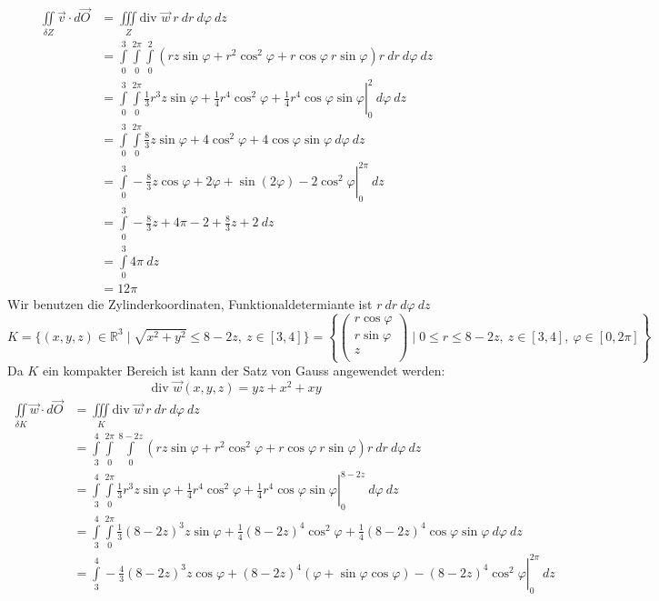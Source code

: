 \documentclass[10pt,a4paper,parskip=half]{scrartcl}
\newcommand{\R}{\mathbb{R}}
\newcommand{\vecthree}[3]{\begin{pmatrix}#1\\#2\\#3\\\end {pmatrix}}
\begin{document}
\begin{enumerate}[(a)]
      \begin{align*}
            \iint\limits_{\delta Z} \vec v \cdot d \vec O &= \iiint\limits_{Z} \text{div } \vec w~ r~dr ~d\varphi~ dz \\
            &= \int\limits_{0}^3\int\limits_0^{2\pi}\int\limits_0^2  (rz\sin\varphi + r^2\cos^2\varphi + r\cos\varphi ~r\sin\varphi )r~dr ~d\varphi~ dz \\
            &= \left.\int\limits_{0}^3\int\limits_0^{2\pi}  \frac 13 r^3z \sin \varphi + \frac 14 r^4 \cos^2 \varphi + \frac 14 r^4 \cos \varphi \sin \varphi \right|^2_0  ~d\varphi ~ dz  \\
            &= \int\limits_{0}^3\int\limits_0^{2\pi} \frac 83 z \sin \varphi + 4\cos^2 \varphi + 4\cos \varphi \sin \varphi ~d\varphi ~dz \\
            &= \left.\int\limits_0^3 -\frac 83  z \cos \varphi + 2\varphi + \sin (2\varphi ) - 2\cos^2\varphi \right|^{2\pi}_0 ~dz\\
            &= \int\limits_0^3 - \frac 83 z + 4\pi - 2 + \frac 83z + 2 ~dz \\
            &= \int\limits_0^3  4\pi ~dz \\
            &= 12\pi
      \end{align*}
Wir benutzen die Zylinderkoordinaten, Funktionaldetermiante ist $r~dr ~ d\varphi ~dz$
   \[ K = \{ (x,y,z) \in \R^3  \mid \sqrt{x^2 + y^2} \le 8 - 2z ,~z \in [3,4]\} = \left\{ \vecthree{r \cos \varphi}{r\sin \varphi}{z} \mid 0 \le r \le 8-2z, ~z \in [3,4] ,~ \varphi \in [0,2\pi] \right\} \] 
   Da $K$ ein kompakter Bereich ist kann der Satz von Gauss angewendet werden:
   \[ \text{div } \vec w(x,y,z) =  yz + x^2 + xy\]
      \begin{align*}
            \iint\limits_{\delta K} \vec w \cdot d \vec O &= \iiint\limits_{K} \text{div } \vec w~ r~dr ~d\varphi~ dz \\
            &= \int\limits_{3}^4\int\limits_0^{2\pi}\int\limits_0^{8-2z}  (rz\sin\varphi + r^2\cos^2\varphi + r\cos\varphi ~r\sin\varphi )r~dr ~d\varphi~ dz \\
             &= \left.\int\limits_{3}^4\int\limits_0^{2\pi}  \frac 13 r^3z \sin \varphi + \frac 14 r^4 \cos^2 \varphi + \frac 14 r^4 \cos \varphi \sin \varphi \right|^{8-2z}_0 ~d\varphi~ dz \\
              &= \int\limits_{3}^4\int\limits_0^{2\pi}  \frac 13 (8-2z)^3z\sin \varphi + \frac 14 (8-2z)^4\cos^2\varphi + \frac 14 (8-2z)^4\cos \varphi \sin \varphi  ~d\varphi~ dz \\
               &= \left.\int\limits_{3}^4  - \frac 43 (8-2z)^3z\cos \varphi + (8-2z)^4(\varphi + \sin \varphi \cos \varphi) -(8-2z)^4\cos^2 \varphi  \right|^{2\pi}_{0}~ dz \\

\end{align*}
\end{enumerate}
\end{document}
